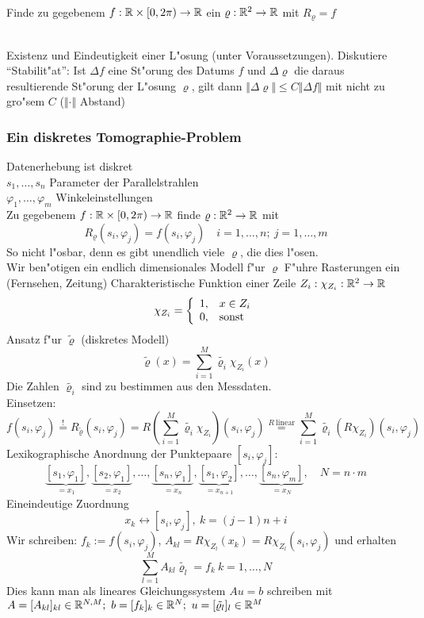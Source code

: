 \documentclass{scrartcl}
\begin{document}
\\
Finde zu gegebenem $f: \mathbb{R} \times [0, 2 \pi ) \rightarrow \mathbb{R}$ ein $\varrho: \mathbb{R}^2 \rightarrow \mathbb{R}$ mit $R_\varrho = f$

 \\
Existenz und Eindeutigkeit einer L"osung (unter Voraussetzungen). Diskutiere "`Stabilit"at"': Ist $\Delta f$ eine St"orung des Datums $f$ und $\Delta \varrho$ die daraus resultierende St"orung der L"osung $\varrho$, gilt dann $ \Vert \Delta \varrho \Vert \leq C \Vert \Delta f \Vert$ mit nicht zu gro"sem $C$ ($\Vert \cdot \Vert$ Abstand)

\subsubsection{Ein diskretes Tomographie-Problem}

Datenerhebung ist diskret \\
$s_1, \ldots, s_n$ Parameter der Parallelstrahlen \\
$\varphi_1, \ldots, \varphi_m$ Winkeleinstellungen \\

 Zu gegebenem $f: \mathbb{R} \times [0, 2 \pi ) \rightarrow \mathbb{R}$ finde $\varrho: \mathbb{R}^2 \rightarrow \mathbb{R}$ mit 
$$ R_\varrho(s_i, \varphi_j) = f(s_i, \varphi_j) \quad i=1,\ldots,n; \ j=1, \ldots, m$$
So nicht l"osbar, denn es gibt unendlich viele $\varrho$, die dies l"osen. \\
Wir ben"otigen ein endlich dimensionales Modell f"ur $\varrho$
 F"uhre Rasterungen ein (Fernsehen, Zeitung)
 Charakteristische Funktion einer Zeile $Z_i: \chi_{Z_i}: \mathbb{R}^2 \rightarrow \mathbb{R}$ 
$$ \chi_{Z_i} = \left\{ \begin{array}{l l} 1, & x \in Z_i \\ 0, & \mathrm{sonst} \end{array} \right. $$
Ansatz f"ur $\tilde{\varrho}$ (diskretes Modell) 
$$ \tilde{\varrho} (x) = \sum\limits_{i=1}^M \tilde{\varrho_i} \chi_{Z_i} (x) $$
Die Zahlen $\tilde{\varrho_i}$ sind zu bestimmen aus den Messdaten. \\
Einsetzen: 
$$f(s_i, \varphi_j) \stackrel{!}{=} R_{\tilde{\varrho}}(s_i, \varphi_j) = R(\sum\limits_{i=1}^M \tilde{\varrho_i} \chi_{Z_i})(s_i, \varphi_j) \stackrel{R \mathrm{ \ linear}}{=} \sum\limits_{i=1}^M \tilde{\varrho_i} (R \chi_{Z_i})(s_i, \varphi_j)$$
Lexikographische Anordnung der Punktepaare 
$[s_i, \varphi_j]$:
$$\underbrace{[s_1,\varphi_1]}_{=x_1}, \underbrace{[s_2,\varphi_1]}_{=x_2}, \ldots, \underbrace{[s_n,\varphi_1]}_{=x_n}, \underbrace{[s_1,\varphi_2]}_{=x_{n+1}}, \ldots, \underbrace{[s_n,\varphi_m]}_{=x_N}, \quad N=n\cdot m$$
Eineindeutige Zuordnung 
$$x_k \leftrightarrow [s_i, \varphi_j], \ k=(j-1)n + i$$ 
Wir schreiben: $f_k := f(s_i, \varphi_j)$, $A_{kl} = R \chi_{Z_l} (x_k) = R \chi_{Z_l} (s_i, \varphi_j)$ und erhalten 
$$\sum\limits_{l=1}^M A_{kl} \tilde{\varrho_l} = f_k \ k=1, \ldots, N$$ 
Dies kann man als lineares Gleichungssystem $A u = b$ schreiben mit $A = [ A_{kl} ]_{kl} \in \mathbb{R}^{N,M}; \ b=[f_k]_k \in \mathbb{R}^N; \ u= [\tilde{\varrho_l} ]_l \in \mathbb{R}^M$
\end{document}
